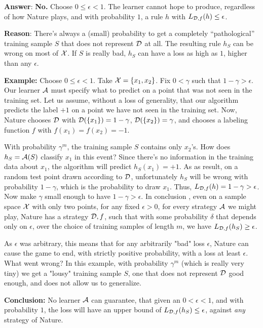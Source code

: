 {\textbf{Answer}: {\bf No.} 
Choose $0\leq \epsilon <1 $. The learner cannot hope to produce, regardless of how Nature plays, and with probability $1$, a rule $h$ with $L_{\mathcal{D},f}(h) \leq \epsilon$.

\textbf{Reason}: There's always a (small) probability to get a completely ``pathological'' training	sample $S$ that does not represent $\mathcal{D}$ at all. The resulting rule $h_S$ can
	be wrong on most of $\mathcal{X}$. If $S$ is really bad, $h_S$ can have a loss as high as $1$, higher than any $\epsilon$.
	
{\bf Example: }
		Choose $0\leq \epsilon <1 $. Take $\mathcal{X}=\left\{ x_1,x_2 \right\}$.  Fix $0<\gamma$ such that  $1-\gamma>\epsilon$. Our learner $\mathcal{A}$ must specify what to predict on a point that was not seen in the training set. 
		Let us assume, without a loss of generality, that our algorithm predicts the label $+1$ on a point we have not seen in the training set. Now, Nature chooses $\mathcal{D}$ with
		$\mathcal{D}(\{x_1\}) = 1-\gamma$, $\mathcal{D}(\{x_2\}) = \gamma$, and chooses a labeling function $f$ with  $f(x_1)=f(x_2)=-1$. 
		
		With probability 		$\gamma^m$, the training sample $S$ contains only  $x_2$'s. How does $h_S=\mathcal{A}(S)$
		classify $x_1$ in this event? Since there's no information in the training data about $x_1$, the algorithm will predict $h_S(x_1)=+1$.
		As as result, on a random test point drawn according to $\mathcal{D}$, unfortunately $h_S$ will be wrong with probability $1-\gamma$, which is the probability to draw $x_1$. Thus,
		$L_{\mathcal{D},f}(h)=1-\gamma>\epsilon$. Now make $\gamma$ small enough to have $1-\gamma > \epsilon$. 
 In conclusion , even on a sample space $\mathcal{X}$ with only two points, for any fixed $\epsilon>0$, 
		for every strategy $\mathcal{A}$ we might play, Nature has a strategy $\mathcal{D},f$, such that 
		with some probability $\delta$ that depends only on $\epsilon$, over the choice of training samples of length $m$, we have  
		$L_{\mathcal{D},f}(h_S) \geq \epsilon$.
		
 As $\epsilon$ was arbitrary, this means that for any arbitrarily "bad" loss $\epsilon$, Nature can cause the game to end, with strictly positive probability, with a loss at least $\epsilon$.
	  What went wrong? In this example, with probability $\gamma^m$ (which is really very tiny) we get a "lousy" training sample $S$, one that does not represent $\mathcal{D}$  good enough, and does not allow us to generalize. 
	  
 
  {\bf Conclusion:} No learner $\mathcal{A}$ can guarantee, that given an $0<\epsilon<1$, and with probability $1$,  the loss will have an upper bound of  $L_{\mathcal{D},f}(h_S) \le \epsilon$, against \textit{any} strategy of Nature. 
	
}
